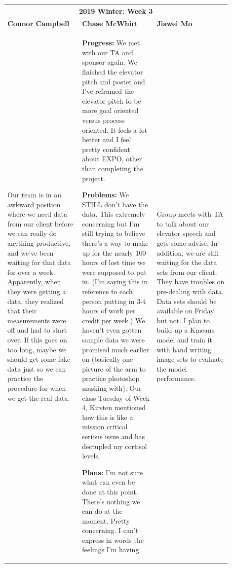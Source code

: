 \documentclass[10pt,journal,compsoc, draftclsnofoot,onecolumn]{IEEEtran}
\begin{document}
\begin{center}
\begin{tabular}{|p{0.3\linewidth}|p{0.3\linewidth}|p{0.3\linewidth}|}
\hline
\multicolumn{3}{|c|}{\textbf{2019 Winter: Week 3}} \\
\hline
\textbf{Connor Campbell} & \textbf{Chase McWhirt} & \textbf{Jiawei Mo} \\ [0.5ex]
\hline\hline

Our team is in an awkward position where we need data from our client before we can really do anything productive, and we've been waiting for that data for over a week. Apparently, when they were getting a data, they realized that their measurements were off and had to start over. If this goes on too long, maybe we should get some fake data just so we can practice the procedure for when we get the real data.
&
\textbf{Progress:} We met with our TA and sponsor again.
We finished the elevator pitch and poster and I've reframed the elevator pitch to be more goal oriented versus process oriented.
It feels a lot better and I feel pretty confident about EXPO, other than completing the project.

\textbf{Problems:} We STILL don't have the data.
This extremely concerning but I'm still trying to believe there's a way to make up for the nearly 100 hours of lost time we were supposed to put in.
(I'm saying this in reference to each person putting in 3-4 hours of work per credit per week.)
We haven't even gotten sample data we were promised much earlier on (basically one picture of the arm to practice photoshop masking with).
Our class Tuesday of Week 4, Kirsten mentioned how this is like a mission critical serious issue and has dectupled my cortisol levels.

\textbf{Plans:} I'm not sure what can even be done at this point.
There's nothing we can do at the moment.
Pretty concerning.
I can't express in words the feelings I'm having.
&
Group meets with TA to talk about our elevator speech and gets some advise. In addition, we are still waiting for the data sets from our client. They have troubles on pre-dealing with data. Data sets should be available on Friday but not. I plan to build up a Kmeans model and train it with hand writing image sets to evaluate the model performance.
\\ \hline
\end{tabular}
\end{center}
\end{document}
